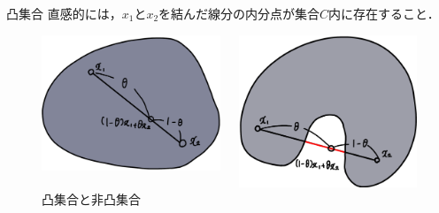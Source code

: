 \documentclass[aspectratio=169, dvipdfmx, 10.5pt]{beamer} %
\begin{document}
\begin{frame}{凸集合}
	直感的には，$x_1$と$x_2$を結んだ線分の内分点が集合$C$内に存在すること．
	\begin{figure}[htbp]
		\begin{columns}
			\begin{column}{0.45\textwidth}
				\centering
				\includegraphics[keepaspectratio, scale=0.12]{convex.png}
			\end{column}
			\begin{column}{0.45\textwidth}
				\centering
				\includegraphics[keepaspectratio, scale=0.12]{non-convex.png}
			\end{column}
		\end{columns}
		\caption{凸集合と非凸集合}
	\end{figure}
\end{frame}
\end{document}
